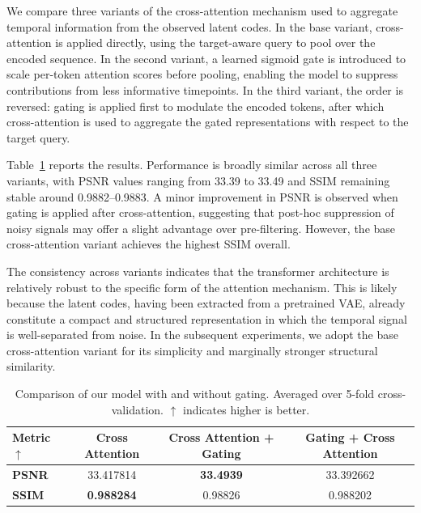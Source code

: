 We compare three variants of the cross-attention mechanism used to aggregate temporal information from the observed latent codes. In the base variant, cross-attention is applied directly, using the target-aware query to pool over the encoded sequence. In the second variant, a learned sigmoid gate is introduced to scale per-token attention scores before pooling, enabling the model to suppress contributions from less informative timepoints. In the third variant, the order is reversed: gating is applied first to modulate the encoded tokens, after which cross-attention is used to aggregate the gated representations with respect to the target query.

Table~\ref{tab:attention} reports the results. Performance is broadly similar across all three variants, with PSNR values ranging from 33.39 to 33.49 and SSIM remaining stable around 0.9882--0.9883. A minor improvement in PSNR is observed when gating is applied after cross-attention, suggesting that post-hoc suppression of noisy signals may offer a slight advantage over pre-filtering. However, the base cross-attention variant achieves the highest SSIM overall.

The consistency across variants indicates that the transformer architecture is relatively robust to the specific form of the attention mechanism. This is likely because the latent codes, having been extracted from a pretrained VAE, already constitute a compact and structured representation in which the temporal signal is well-separated from noise. In the subsequent experiments, we adopt the base cross-attention variant for its simplicity and marginally stronger structural similarity.

\begin{table}[ht]
\centering
\caption{Comparison of our model with and without gating. Averaged over 5-fold cross-validation. $\uparrow$ indicates higher is better.}
\begin{tabular}{>{\bfseries}lccc}
\toprule
Metric $\uparrow$ & Cross Attention & Cross Attention + Gating & Gating + Cross Attention \\
\midrule
PSNR  & 33.417814  & \textbf{33.4939} & 33.392662 \\
SSIM  & \textbf{0.988284} & 0.98826 & 0.988202 \\
\bottomrule
\end{tabular}
\label{tab:attention}
\end{table}


